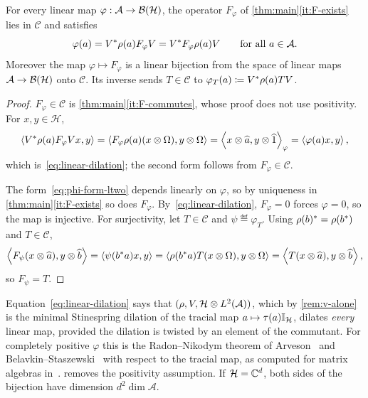 \documentclass[12pt]{article}
\newcommand{\alg}{\mathcal{A}}             %
\newcommand{\hilb}{\mathcal{H}}            %
\newcommand{\bdd}[1]{\mathcal{B}\br{#1}}   %
\newcommand{\ip}[2]{\left\langle #1 , #2 \right\rangle}
\newcommand{\ipphi}[2]{\left\langle #1 , #2 \right\rangle_{\varphi}}
\newcommand{\Ltwo}{L^2\br{\alg}}           %
\newcommand{\vect}[1]{\widehat{#1}}        %
\newcommand{\Ltn}{\hilb \tensor \Ltwo}     %
\newcommand{\Fphi}{F_{\varphi}}            %
\begin{document}
\begin{theorem}
\label{thm:linear}
For every linear map \(\varphi : \alg \to \bdd{\hilb}\), the operator \(\Fphi\)
of \cref{thm:main}\ref{it:F-exists} lies in \(\mathcal{C}\) and satisfies
\begin{equation}
\label{eq:linear-dilation}
  \varphi(a) = V^\adjoint \rho(a) \Fphi V = V^\adjoint \Fphi \rho(a) V
  \qquad \text{for all } a \in \alg .
\end{equation}
Moreover the map \(\varphi \mapsto \Fphi\) is a linear bijection from the space
of linear maps \(\alg \to \bdd{\hilb}\) onto \(\mathcal{C}\). Its inverse sends
\(T \in \mathcal{C}\) to \(\varphi_T(a) \coloneqq V^* \rho(a) T V\).
\end{theorem}
\begin{proof}
\(\Fphi \in \mathcal{C}\) is \cref{thm:main}\ref{it:F-commutes}, whose proof
does not use positivity. For \(x, y \in \hilb\),
\[
  \ip{V^\adjoint \rho(a)\Fphi V x}{y}
  = \ip{\Fphi \rho(a)(x \tensor \Omega)}{y \tensor \Omega}
  = \ipphi{x \tensor \vect{a}}{y \tensor \vect{1}}
  = \ip{\varphi(a)x}{y},
\]
which is~\eqref{eq:linear-dilation}; the second form follows from
\(\Fphi \in \mathcal{C}\).

The form~\eqref{eq:phi-form-ltwo} depends linearly on \(\varphi\), so by
uniqueness in \cref{thm:main}\ref{it:F-exists} so does \(\Fphi\).
By~\eqref{eq:linear-dilation}, \(\Fphi = 0\) forces \(\varphi = 0\), so the map
is injective. For surjectivity, let \(T \in \mathcal{C}\) and
\(\psi \eqdef \varphi_T\). Using \(\rho(b)^* = \rho(b^*)\) and
\(T \in \mathcal{C}\),
\[
  \ip{F_\psi (x \tensor \vect{a})}{y \tensor \vect{b}}
  = \ip{\psi(b^\adjoint a)x}{y}
  = \ip{\rho(b^\adjoint a) T (x \tensor \Omega)}{y \tensor \Omega}
  = \ip{T (x \tensor \vect{a})}{y \tensor \vect{b}},
\]
so \(F_\psi = T\).
\end{proof}

\begin{remark}
Equation~\eqref{eq:linear-dilation} says that \((\rho, V, \Ltn)\), which by
\cref{rem:v-alone} is the minimal Stinespring dilation of the tracial map
\(a \mapsto \tau(a)\id_{\hilb}\), dilates \emph{every} linear map, provided the
dilation is twisted by an element of the commutant. For completely positive
\(\varphi\) this is the Radon--Nikodym theorem of
Arveson~\cite{Arveson1969} and Belavkin--Staszewski~\cite{BelavkinStaszewski1986}
with respect to the tracial map, as computed for matrix algebras
in~\cite[Theorem~5.1]{Raginsky2003}.  removes the positivity
assumption. If \(\hilb = \complex^d\), both sides of the bijection have dimension
\(d^2 \dim \alg\).
\end{remark}
\end{document}
